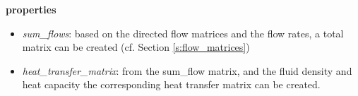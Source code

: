 \textbf{properties}
\begin{itemize}
	\item \emph{sum\_flows}: based on the directed flow matrices and the flow rates, a total matrix can be created (cf. Section \ref{s:flow_matrices})
	\item \emph{heat\_transfer\_matrix}: from the sum\_flow matrix, and the fluid density and heat capacity the corresponding heat transfer matrix can be created.  
\end{itemize}
%
%
%
%
% 
%
